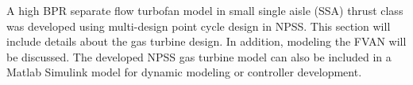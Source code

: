 
A high BPR separate flow turbofan model in small single aisle (SSA) thrust class was developed using multi-design point cycle design \cite{Schutte:2012:2,Schutte:2012:1} in NPSS. This section will include details about the gas turbine design. In addition, modeling the FVAN will be discussed. The developed NPSS gas turbine model can also be included in a Matlab Simulink model for dynamic modeling or controller development. 